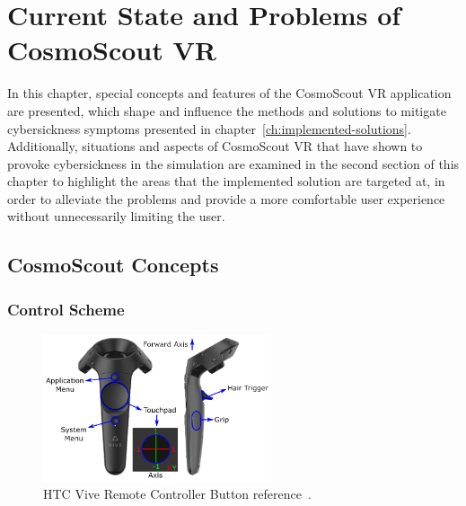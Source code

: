 \chapter{Current State and Problems of CosmoScout VR}\label{ch:current-state-and-problems-of-cosmoscout}

In this chapter, special concepts and features of the CosmoScout VR application are presented, which shape and
influence the methods and solutions to mitigate cybersickness symptoms presented in
chapter~\ref{ch:implemented-solutions}.
\\
Additionally, situations and aspects of CosmoScout VR that have shown to provoke cybersickness in the simulation are
examined in the second section of this chapter to highlight the areas that the implemented solution are targeted at,
in order to alleviate the problems and provide a more comfortable user experience without unnecessarily limiting the
user.

\section{CosmoScout Concepts}\label{sec:cosmoscout-concepts}
\subsection{Control Scheme}\label{subsec:control-scheme}

\begin{figure}[h]
    \centering
    \includegraphics[width=0.6\textwidth]{content/3_current_state/img/ViveControllerButtons[BAA2017]}
    \caption{HTC Vive Remote Controller Button reference~\cite{BAA2017}.}
    \label{fig:controller-reference}
\end{figure}

